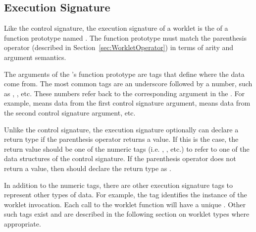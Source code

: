 

\subsection{Execution Signature}
\label{sec:ExecutionSignature}


Like the control signature, the execution signature of a worklet is the
 of a function prototype named \executionsignature. The
function prototype must match the parenthesis operator (described in
Section~\ref{sec:WorkletOperator}) in terms of arity and argument
semantics.


The arguments of the \executionsignature's function prototype are tags that
define where the data come from. The most common tags are an underscore
followed by a number, such as , , etc. These
numbers refer back to the corresponding argument in the
\controlsignature. For example,  means data from the first
control signature argument,  means data from the second
control signature argument, etc.

Unlike the control signature, the execution signature optionally can
declare a return type if the parenthesis operator returns a value. If this
is the case, the return value should be one of the numeric tags
(i.e. , , etc.) to refer to one of the data
structures of the control signature. If the parenthesis operator does not
return a value, then \executionsignature should declare the return type as
.

In addition to the numeric tags, there are other execution signature tags
to represent other types of data. For example, the  tag
identifies the instance of the worklet invocation. Each call to the worklet
function will have a unique . Other such tags exist and
are described in the following section on worklet types where appropriate.


